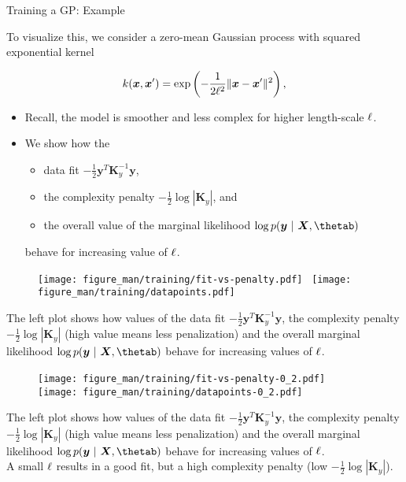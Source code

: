 \begin{vbframe}{Training a GP: Example}

To visualize this, we consider a zero-mean Gaussian process with squared exponential kernel

$$
k(\bm{x}, \bm{x}^\prime) = \exp\left(-\frac{1}{2\ell^2}\|\bm{x} - \bm{x}^\prime\|^2\right),
$$


\begin{itemize}
	\item Recall, the model is smoother and less complex for higher length-scale $\ell$.
	\item We show how the 
	\begin{itemize}
		\item data fit $-\frac{1}{2}\bm{y}^T\bm{K}_y^{-1} \bm{y}$, 
		\item the complexity penalty $- \frac{1}{2} \log \left| \bm{K}_y \right|$, and 
		\item the overall value of the marginal likelihood $\log p(\bm{y} ~|~ \bm{X}, \thetab)$ 
	\end{itemize}
	behave for increasing value of $\ell$.
\end{itemize}

\framebreak 

\begin{figure}
	\texttt{[image: figure\_man/training/fit-vs-penalty.pdf]}~	\texttt{[image: figure\_man/training/datapoints.pdf]}
\end{figure}

\begin{footnotesize}
	The left plot shows how values of the data fit $-\frac{1}{2}\bm{y}^T\bm{K}_y^{-1} \bm{y}$, the complexity penalty $- \frac{1}{2} \log \left| \bm{K}_y \right|$ (high value means less penalization) and the overall marginal likelihood $\log p(\bm{y} ~|~ \bm{X}, \thetab)$ behave for increasing values of $\ell$.
\end{footnotesize}


\framebreak 

\begin{figure}
	\texttt{[image: figure\_man/training/fit-vs-penalty-0\_2.pdf]}~	\texttt{[image: figure\_man/training/datapoints-0\_2.pdf]}
\end{figure}

\begin{footnotesize}
		The left plot shows how values of the data fit $-\frac{1}{2}\bm{y}^T\bm{K}_y^{-1} \bm{y}$, the complexity penalty $- \frac{1}{2} \log \left| \bm{K}_y \right|$ (high value means less penalization) and the overall marginal likelihood $\log p(\bm{y} ~|~ \bm{X}, \thetab)$ behave for increasing values of $\ell$.\\ 
		A small $\ell$ results in a good fit, but a high complexity penalty (low $- \frac{1}{2} \log \left| \bm{K}_y \right|$).
\end{footnotesize}


\end{vbframe}
